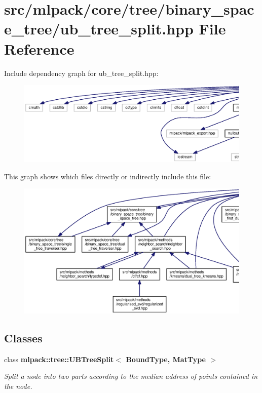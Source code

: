 \section{src/mlpack/core/tree/binary\+\_\+space\+\_\+tree/ub\+\_\+tree\+\_\+split.hpp File Reference}
\label{ub__tree__split_8hpp}
Include dependency graph for ub\+\_\+tree\+\_\+split.\+hpp\+:
\nopagebreak
\begin{figure}[H]
\begin{center}
\leavevmode
\includegraphics[width=350pt]{ub__tree__split_8hpp__incl}
\end{center}
\end{figure}
This graph shows which files directly or indirectly include this file\+:
\nopagebreak
\begin{figure}[H]
\begin{center}
\leavevmode
\includegraphics[width=350pt]{ub__tree__split_8hpp__dep__incl}
\end{center}
\end{figure}
\subsection*{Classes}
\begin{DoxyCompactItemize}
\item 
class {\bf mlpack\+::tree\+::\+U\+B\+Tree\+Split$<$ Bound\+Type, Mat\+Type $>$}
\begin{DoxyCompactList}\small\item\em Split a node into two parts according to the median address of points contained in the node. \end{DoxyCompactList}\end{DoxyCompactItemize}
